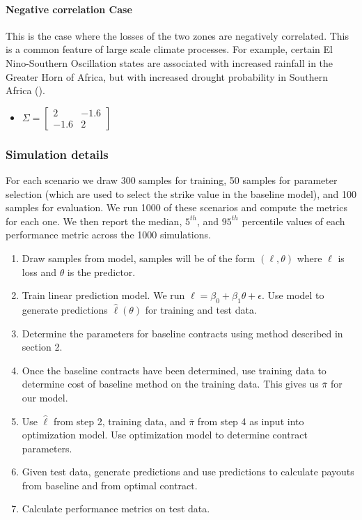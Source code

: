 \documentclass[11pt]{article}
\begin{document}
     \paragraph*{Negative correlation Case}
       This is the case where the losses of the two zones are negatively correlated. This is a common feature of large scale climate processes. For example, certain El Nino-Southern Oscillation states are associated with increased rainfall in the Greater Horn of Africa, but with increased drought probability in Southern Africa (\cite{barrett2007poverty}). 
       \begin{itemize}
           \item $\Sigma = \begin{bmatrix}
               2 & -1.6 \\
               -1.6 & 2 
               \end{bmatrix} $
       \end{itemize}

   \subsubsection{Simulation details}
     For each scenario we draw 300 samples for training, 50 samples for parameter selection (which are used to select the strike value in the baseline model), and 100 samples for evaluation. We run 1000 of these scenarios and compute the metrics for each one. We then report the median, $5^{th}$, and $95^{th}$ percentile values of each performance metric across the 1000 simulations. 
     \begin{enumerate}
       \item Draw samples from model, samples will be of the form $(\ell,\theta)$ where $\ell$ is loss and $\theta$ is the predictor. 
       \item Train linear prediction model. We run $\ell = \beta_0 + \beta_1\theta +\epsilon$. Use model to generate predictions $\hat{\ell}(\theta)$ for training and test data. 
       \item Determine the parameters for baseline contracts using method described in section 2. 
       \item Once the baseline contracts have been determined, use training data to determine cost of baseline method on the training data. This gives us $\overline{\pi}$ for our model. 
       \item Use $\hat{\ell}$ from step 2, training data, and $\overline{\pi}$ from step 4 as input into optimization model. Use optimization  model to determine contract parameters. 
       \item Given test data, generate predictions and use predictions to calculate payouts from baseline and from optimal contract. 
       \item Calculate performance metrics on test data. 
     \end{enumerate}
\end{document}
